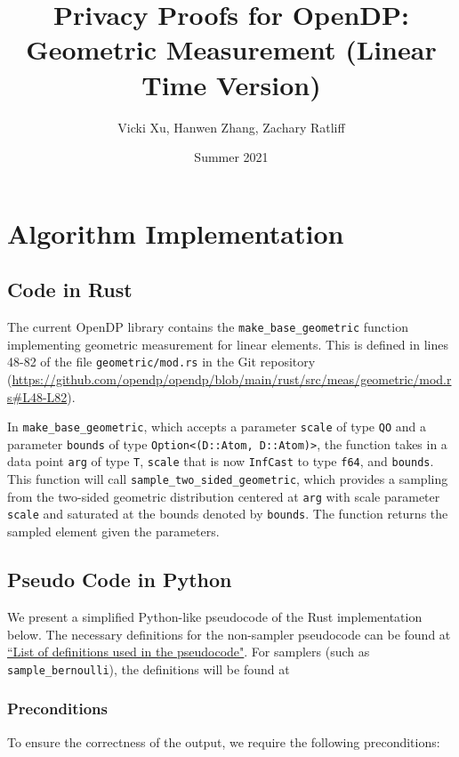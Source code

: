 \documentclass[11pt,a4paper]{article}
\title{Privacy Proofs for OpenDP: Geometric Measurement (Linear Time Version)}
\author{Vicki Xu, Hanwen Zhang, Zachary Ratliff}
\date{Summer 2021}
\newcommand{\vicki}[1]{{ {\color{olive}{(vicki)~#1}}}}
\begin{document}
\maketitle
\tableofcontents

\section{Algorithm Implementation}
\subsection{Code in Rust}
The current OpenDP library contains the \texttt{make\_base\_geometric} function implementing geometric measurement for linear elements. This is defined in lines 48-82 of the file \texttt{geometric/mod.rs} in the Git repository (\url{https://github.com/opendp/opendp/blob/main/rust/src/meas/geometric/mod.rs#L48-L82}).

\vicki{is this right?} 
In \texttt{make\_base\_geometric}, which accepts a parameter \texttt{scale} of type \texttt{QO} and a parameter \texttt{bounds} of type \texttt{Option<(D::Atom, D::Atom)>}, the function takes in a data point \texttt{arg} of type \texttt{T}, \texttt{scale} that is now \texttt{InfCast} to type \texttt{f64}, and \texttt{bounds}. This function will call \texttt{sample\_two\_sided\_geometric}, which provides a sampling from the two-sided geometric distribution centered at \texttt{arg} with scale parameter \texttt{scale} and saturated at the bounds denoted by \texttt{bounds}. The function returns the sampled element given the parameters. 

\subsection{Pseudo Code in Python}\label{sec:pseudocode}

We present a simplified Python-like pseudocode of the Rust implementation below. The necessary definitions for the non-sampler pseudocode can be found at \href{https://github.com/opendp/whitepapers/blob/pseudocode-defns/pseudocode-defns/pseudocode_defns.pdf}{``List of definitions used in the pseudocode"}. \vicki{fix link} For samplers (such as \texttt{sample\_bernoulli}), the definitions will be found at \vicki{insert link here}

\subsubsection*{Preconditions}
To ensure the correctness of the output, we require the following preconditions:
\end{document}
